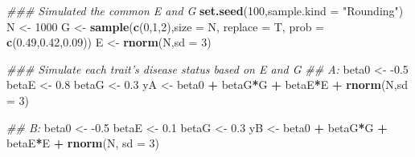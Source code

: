 \documentclass[
]{article}
\newenvironment{Shaded}{\begin{snugshade}}{\end{snugshade}}
\newcommand{\CommentTok}[1]{\textcolor[rgb]{0.56,0.35,0.01}{\textit{#1}}}
\newcommand{\DataTypeTok}[1]{\textcolor[rgb]{0.13,0.29,0.53}{#1}}
\newcommand{\DecValTok}[1]{\textcolor[rgb]{0.00,0.00,0.81}{#1}}
\newcommand{\FloatTok}[1]{\textcolor[rgb]{0.00,0.00,0.81}{#1}}
\newcommand{\KeywordTok}[1]{\textcolor[rgb]{0.13,0.29,0.53}{\textbf{#1}}}
\newcommand{\NormalTok}[1]{#1}
\newcommand{\OperatorTok}[1]{\textcolor[rgb]{0.81,0.36,0.00}{\textbf{#1}}}
\newcommand{\StringTok}[1]{\textcolor[rgb]{0.31,0.60,0.02}{#1}}
\begin{document}
\begin{Shaded}
\begin{Highlighting}[]
\CommentTok{### Simulated the common E and G}
\KeywordTok{set.seed}\NormalTok{(}\DecValTok{100}\NormalTok{,}\DataTypeTok{sample.kind =} \StringTok{"Rounding"}\NormalTok{)}
\NormalTok{N <-}\StringTok{ }\DecValTok{1000}
\NormalTok{G <-}\StringTok{ }\KeywordTok{sample}\NormalTok{(}\KeywordTok{c}\NormalTok{(}\DecValTok{0}\NormalTok{,}\DecValTok{1}\NormalTok{,}\DecValTok{2}\NormalTok{),}\DataTypeTok{size =}\NormalTok{ N, }\DataTypeTok{replace =}\NormalTok{ T, }\DataTypeTok{prob =} \KeywordTok{c}\NormalTok{(}\FloatTok{0.49}\NormalTok{,}\FloatTok{0.42}\NormalTok{,}\FloatTok{0.09}\NormalTok{))}
\NormalTok{E <-}\StringTok{ }\KeywordTok{rnorm}\NormalTok{(N,}\DataTypeTok{sd =} \DecValTok{3}\NormalTok{)}

\CommentTok{### Simulate each trait's disease status based on E and G}
\CommentTok{## A:}
\NormalTok{beta0 <-}\StringTok{ }\FloatTok{-0.5}
\NormalTok{betaE <-}\StringTok{ }\FloatTok{0.8}
\NormalTok{betaG <-}\StringTok{ }\FloatTok{0.3}
\NormalTok{yA <-}\StringTok{ }\NormalTok{beta0 }\OperatorTok{+}\StringTok{ }\NormalTok{betaG}\OperatorTok{*}\NormalTok{G }\OperatorTok{+}\StringTok{ }\NormalTok{betaE}\OperatorTok{*}\NormalTok{E }\OperatorTok{+}\StringTok{ }\KeywordTok{rnorm}\NormalTok{(N,}\DataTypeTok{sd =} \DecValTok{3}\NormalTok{)}

\CommentTok{## B:}
\NormalTok{beta0 <-}\StringTok{ }\FloatTok{-0.5}
\NormalTok{betaE <-}\StringTok{ }\FloatTok{0.1}
\NormalTok{betaG <-}\StringTok{ }\FloatTok{0.3}
\NormalTok{yB <-}\StringTok{ }\NormalTok{beta0 }\OperatorTok{+}\StringTok{ }\NormalTok{betaG}\OperatorTok{*}\NormalTok{G }\OperatorTok{+}\StringTok{ }\NormalTok{betaE}\OperatorTok{*}\NormalTok{E }\OperatorTok{+}\StringTok{ }\KeywordTok{rnorm}\NormalTok{(N, }\DataTypeTok{sd =} \DecValTok{3}\NormalTok{)}


\end{Highlighting}
\end{Shaded}
\end{document}
